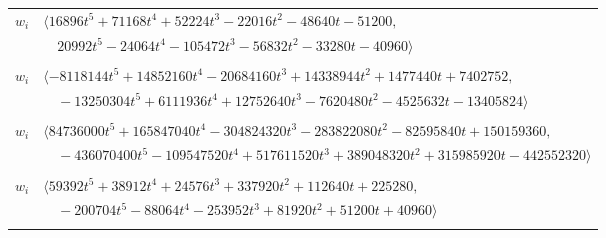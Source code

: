 \documentclass[11pt]{article}
\begin{document}
\begin{longtable}{@{}ll@{}}
$w_i$ & $\langle 16896t^{5}+71168t^{4}+52224t^{3}-22016t^{2}-48640t-51200,$\\
 & $\quad 20992t^{5}-24064t^{4}-105472t^{3}-56832t^{2}-33280t-40960\rangle$\\
\addlinespace[2pt]
\multicolumn{2}{@{}p{0.97\textwidth}@{}}{$i=28$, $D_i=7776$, $\rho_{ij}$: $4{:}2, \allowbreak 6{:}1, \allowbreak 7{:}1, \allowbreak 21{:}1, \allowbreak 26{:}1, \allowbreak 31{:}2, \allowbreak 32{:}1, \allowbreak 46{:}1, \allowbreak 50{:}1, \allowbreak 51{:}1, \allowbreak 54{:}3, \allowbreak 62{:}1, \allowbreak 64{:}3, \allowbreak 67{:}3, \allowbreak 71{:}2, \allowbreak 72{:}1$}\\
$w_i$ & $\langle -8118144t^{5}+14852160t^{4}-20684160t^{3}+14338944t^{2}+1477440t+7402752,$\\
 & $\quad -13250304t^{5}+6111936t^{4}+12752640t^{3}-7620480t^{2}-4525632t-13405824\rangle$\\
\addlinespace[2pt]
\multicolumn{2}{@{}p{0.97\textwidth}@{}}{$i=29$, $D_i=2560$, $\rho_{ij}$: $1{:}2, \allowbreak 4{:}1, \allowbreak 7{:}3, \allowbreak 15{:}2, \allowbreak 17{:}2, \allowbreak 23{:}3, \allowbreak 26{:}1, \allowbreak 27{:}2, \allowbreak 32{:}2, \allowbreak 41{:}1, \allowbreak 45{:}2, \allowbreak 47{:}3, \allowbreak 50{:}2, \allowbreak 55{:}1, \allowbreak 58{:}3, \allowbreak 61{:}1, \allowbreak 65{:}1, \allowbreak 71{:}2, \allowbreak 72{:}3$}\\
$w_i$ & $\langle 84736000t^{5}+165847040t^{4}-304824320t^{3}-283822080t^{2}-82595840t+150159360,$\\
 & $\quad -436070400t^{5}-109547520t^{4}+517611520t^{3}+389048320t^{2}+315985920t-442552320\rangle$\\
\addlinespace[2pt]
\multicolumn{2}{@{}p{0.97\textwidth}@{}}{$i=30$, $D_i=256$, $\rho_{ij}$: $6{:}3, \allowbreak 10{:}2, \allowbreak 15{:}2, \allowbreak 17{:}3, \allowbreak 22{:}2, \allowbreak 23{:}2, \allowbreak 31{:}2, \allowbreak 33{:}2, \allowbreak 41{:}2, \allowbreak 46{:}1, \allowbreak 47{:}2, \allowbreak 50{:}3, \allowbreak 52{:}1, \allowbreak 62{:}3, \allowbreak 63{:}2, \allowbreak 73{:}2, \allowbreak 78{:}1, \allowbreak 80{:}3$}\\
$w_i$ & $\langle 59392t^{5}+38912t^{4}+24576t^{3}+337920t^{2}+112640t+225280,$\\
 & $\quad -200704t^{5}-88064t^{4}-253952t^{3}+81920t^{2}+51200t+40960\rangle$\\
\addlinespace[2pt]
\multicolumn{2}{@{}p{0.97\textwidth}@{}}{$i=31$, $D_i=1280$, $\rho_{ij}$: $0{:}1, \allowbreak 1{:}1, \allowbreak 4{:}3, \allowbreak 12{:}3, \allowbreak 25{:}3, \allowbreak 26{:}1, \allowbreak 27{:}2, \allowbreak 28{:}2, \allowbreak 30{:}2, \allowbreak 37{:}2, \allowbreak 41{:}1, \allowbreak 42{:}2, \allowbreak 53{:}1, \allowbreak 63{:}2, \allowbreak 66{:}3, \allowbreak 70{:}2, \allowbreak 75{:}3, \allowbreak 78{:}3$}\\

\end{longtable}
\end{document}
